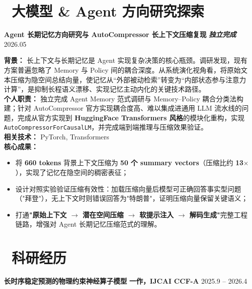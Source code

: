 \documentclass[11pt]{article}
\begin{document}
\section{\makebox[\widthof{\faRobot}][c]{\color{CVBlue}\faRobot}\ 大模型 \& Agent 方向研究探索}

\textbf{Agent 长期记忆方向研究与 AutoCompressor 长上下文压缩复现}
\textit{\textbf{独立完成}}
\hfill 2026.05

\textbf{背景：} 长上下文与长期记忆是 Agent 实现复杂决策的核心瓶颈。调研发现，现有方案普遍忽略了 Memory 与 Policy 间的耦合深度。从系统演化视角看，将原始文本压缩为隐空间总结向量，使记忆从“外部被动检索”转变为“内部状态参与注意力计算”，是抑制长程语义漂移、实现记忆主动内化的关键技术路径。\\
\textbf{个人职责：} 独立完成 Agent Memory 范式调研与 Memory–Policy 耦合分类法构建；针对 AutoCompressor 官方实现耦合度高、难以集成进通用 LLM 流水线的问题，完成从官方实现到 \textbf{HuggingFace Transformers 风格}的模块化重构，实现 \texttt{AutoCompressorForCausalLM}，并完成端到端推理与压缩效果验证。\\
\textbf{相关技术：} PyTorch, Transformers\\
\textbf{核心成果：}
\begin{itemize}[leftmargin=1.6em]
    \item 将 \textbf{660 tokens} 背景上下文压缩为 \textbf{50 个 summary vectors}（压缩比约 \textbf{13$\times$}），实现了记忆在隐空间的稠密表征；
    \item 设计对照实验验证压缩有效性：加载压缩向量后模型可正确回答事实型问题（"拜登"），无上下文时则错误回答为"特朗普"，证明压缩向量保留关键语义；
    \item 打通\textbf{"原始上下文 $\rightarrow$ 潜在空间压缩 $\rightarrow$ 软提示注入 $\rightarrow$ 解码生成"}完整工程链路，增强对 Agent 长期记忆压缩范式的理解。
\end{itemize}



\section{\makebox[\widthof{\faUsers}][c]{\color{CVBlue}\faUsers}\ 
科研经历}
\textbf{长时序稳定预测的物理约束神经算子模型} 
\textcolor{CVBlue}{\textbf{一作，IJCAI CCF-A}}
\hfill 2025.9 -- 2026.4
\end{document}
